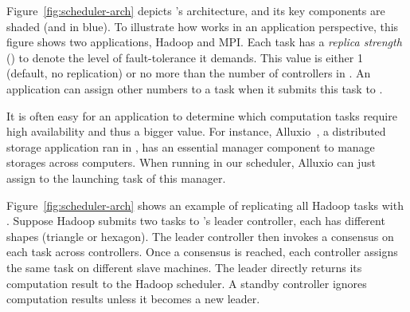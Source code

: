 



Figure~\ref{fig:scheduler-arch} depicts \tripod's architecture, and its key 
components are shaded (and in blue). To illustrate how \tripod works in an 
application perspective, this figure shows two applications, Hadoop and MPI. 
Each task has a \emph{replica strength} () to denote the level of 
fault-tolerance it demands. This  value is either 1 (default, no 
replication) or no more than the number of controllers in \tripod. An 
application can assign other  numbers to a task when it submits this task 
to \tripod.

It is often easy for an application to determine which computation tasks 
require high availability and thus a bigger  value. For instance, 
Alluxio~\cite{alluxio}, a distributed storage application ran in \mesos, has 
an essential manager component to manage storages across computers. When 
running in our \tripod scheduler, Alluxio can just assign  to the 
launching task of this manager.


Figure~\ref{fig:scheduler-arch} shows an example of replicating all Hadoop 
tasks with . Suppose Hadoop submits two tasks to \tripod's leader 
controller, each has different shapes (triangle or hexagon). The leader 
controller then invokes a consensus on each task across controllers. Once a 
consensus is reached, each controller assigns the same task on different slave 
machines. The leader directly returns its computation result to the 
Hadoop scheduler. A standby controller ignores computation results unless it 
becomes a new leader.

